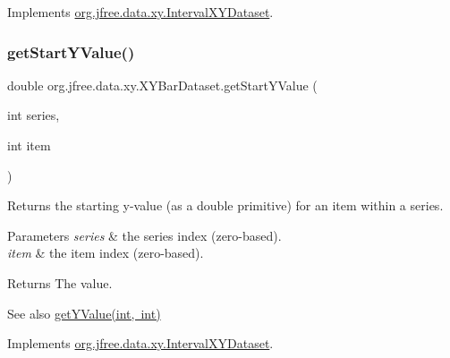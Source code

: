 Implements \mbox{\hyperlink{interfaceorg_1_1jfree_1_1data_1_1xy_1_1_interval_x_y_dataset_afdd414735adb233734bc35b76a005ed9}{org.\+jfree.\+data.\+xy.\+Interval\+X\+Y\+Dataset}}.

\mbox{\label{classorg_1_1jfree_1_1data_1_1xy_1_1_x_y_bar_dataset_acecbf0eedd803245aa43c76e0937fb6c}} 
\subsubsection{\texorpdfstring{get\+Start\+Y\+Value()}{getStartYValue()}}
{\footnotesize\ttfamily double org.\+jfree.\+data.\+xy.\+X\+Y\+Bar\+Dataset.\+get\+Start\+Y\+Value (\begin{DoxyParamCaption}\item[{int}]{series,  }\item[{int}]{item }\end{DoxyParamCaption})}

Returns the starting y-\/value (as a double primitive) for an item within a series.


\begin{DoxyParams}{Parameters}
{\em series} & the series index (zero-\/based). \\
\hline
{\em item} & the item index (zero-\/based).\\
\hline
\end{DoxyParams}
\begin{DoxyReturn}{Returns}
The value.
\end{DoxyReturn}
\begin{DoxySeeAlso}{See also}
\mbox{\hyperlink{classorg_1_1jfree_1_1data_1_1xy_1_1_x_y_bar_dataset_ad5f518543e018a6bc34cfe303bc9fa69}{get\+Y\+Value(int, int)}} 
\end{DoxySeeAlso}


Implements \mbox{\hyperlink{interfaceorg_1_1jfree_1_1data_1_1xy_1_1_interval_x_y_dataset_aed1acf6e36561ce5acc3f6811a2ecef9}{org.\+jfree.\+data.\+xy.\+Interval\+X\+Y\+Dataset}}.

\mbox{\label{classorg_1_1jfree_1_1data_1_1xy_1_1_x_y_bar_dataset_a10a895a45474c8af19a794fd5908a197}} 
